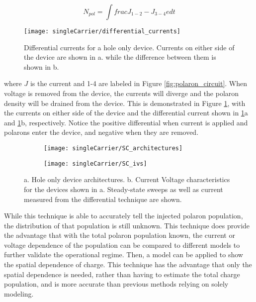 \documentclass[../thesis.tex]{subfiles}
\begin{document}
\begin{equation}
N_{pol}=\int frac{J_{1-2}-J_{3-4}}{e}dt
\label{eqn:polaron_population_calculation}
\end{equation}

\begin{figure}[ht]
\centering
\texttt{[image: singleCarrier/differential\_currents]}
\caption{Differential currents for a hole only device. Currents on either side of the device are shown in a. while the difference between them is shown in b.}
\label{fig:differential_currents}
\end{figure}

where $J$ is the current and 1-4 are labeled in Figure \ref{fig:polaron_circuit}.
When voltage is removed from the device, the currents will diverge and the polaron density will be drained from the device.
This is demonstrated in Figure \ref{fig:differential_currents}, with the currents on either side of the device and the differential current shown in \ref{fig:differential_currents}a and \ref{fig:differential_currents}b, respectively.
Notice the positive differential when current is applied and polarons enter the device, and negative when they are removed.

\begin{wrapfigure}{r}{.5\textwidth}
    \begin{minipage}{\linewidth}
    \centering%
    \begin{subfigure}{.24\textwidth}
    \texttt{[image: singleCarrier/SC\_architectures]}
    \caption{}
    \label{fig:SC_architectures}\par\vfill
    \end{subfigure}

    \begin{subfigure}{.24\textwidth}
    \texttt{[image: singleCarrier/SC\_ivs]}
    \caption{}
    \label{fig:SC_ivs}
    \end{subfigure}
\end{minipage}
\caption{a. Hole only device architectures. b. Current Voltage characteristics for the devices shown in a.  Steady-state sweeps as well as current measured from the differential technique are shown.}
\end{wrapfigure}

While this technique is able to accurately tell the injected polaron population, the distribution of that population is still unknown.
This technique does provide the advantage that with the total polaron population known, the current or voltage dependence of the population can be compared to different models to further validate the operational regime.
Then, a model can be applied to show the spatial dependence of charge.\supercite{Pope1999,Mark1962,Lampert2002a}
This technique has the advantage that only the spatial dependence is needed, rather than having to estimate the total charge population, and is more accurate than previous methods relying on solely modeling.
\end{document}
